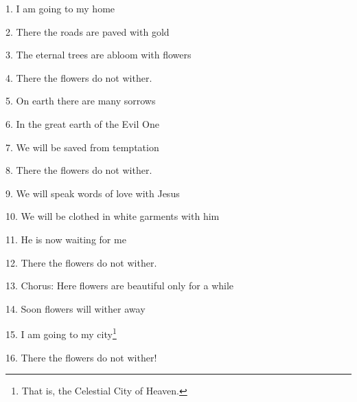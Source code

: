 \setcounter{footnote}{0}

1. I am going to my home

2. There the roads are paved with gold

3. The eternal trees are abloom with flowers

4. There the flowers do not wither.

5. On earth there are many sorrows

6. In the great earth of the Evil One

7. We will be saved from temptation

8. There the flowers do not wither.

9. We will speak words of love with Jesus

10. We will be clothed in white garments with him

11. He is now waiting for me

12. There the flowers do not wither.

13. Chorus: Here flowers are beautiful only for a while

14. Soon flowers will wither away

15. I am going to my city\footnote{That is, the Celestial City of Heaven.}

16. There the flowers do not wither!

